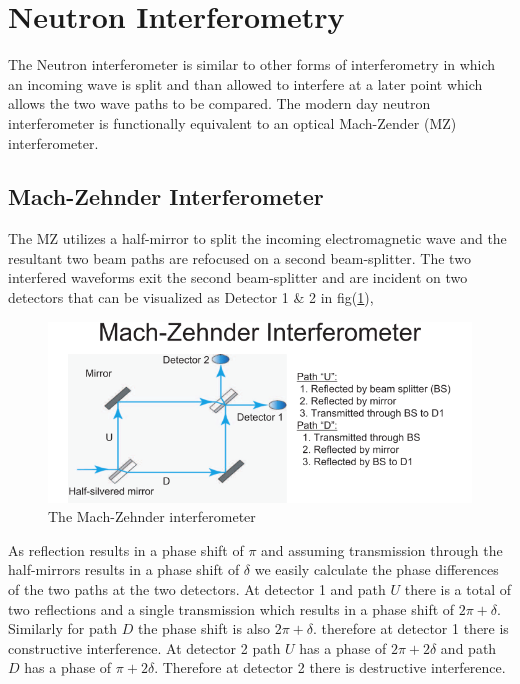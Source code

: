 \section{Neutron Interferometry}
The Neutron interferometer is similar to other forms of interferometry in which an incoming wave is split and than allowed to interfere at a later point which allows the two wave paths to be compared. The modern day neutron interferometer is functionally equivalent to an optical Mach-Zender (MZ) interferometer.

\subsection{Mach-Zehnder Interferometer}

The MZ utilizes a half-mirror to split the incoming electromagnetic wave and the resultant two beam paths are refocused on a second beam-splitter. The two interfered waveforms exit the second beam-splitter and are incident on two detectors that can be visualized as Detector 1 \& 2 in fig(\ref{mach-zehnder}),

\begin{figure}[ht!]
\centering
\includegraphics[scale=0.5]{Figures/mach-zender.png}
\caption{The Mach-Zehnder interferometer}
\label{mach-zehnder}
\end{figure}

As reflection results in a phase shift of $\pi$ and assuming transmission through the half-mirrors results in a phase shift of $\delta$ we easily calculate the phase differences of the two paths at the two detectors. At detector 1 and path $U$ there is a total of two reflections and a single transmission which results in a phase shift of $2\pi+\delta$. Similarly for path $D$ the phase shift is also $2\pi + \delta$. therefore at detector 1 there is constructive interference. At detector 2 path $U$ has a phase of $2\pi + 2\delta$ and path $D$ has a phase of $\pi + 2\delta$. Therefore at detector 2 there is destructive interference.\cite{dimaThesis}



